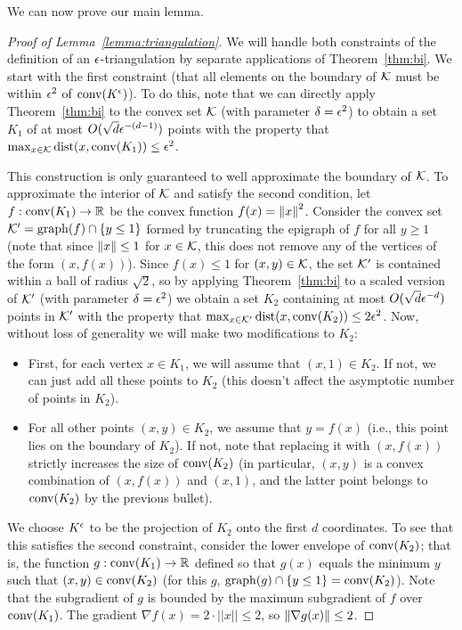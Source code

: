 We can now prove our main lemma.

\begin{proof}[Proof of Lemma~\ref{lemma:triangulation}]


We will handle both constraints of the definition of an $\epsilon$-triangulation by separate applications of Theorem~\ref{thm:bi}. We start with the first constraint (that all elements on the boundary of $\mathcal{K}$ must be within $\epsilon^2$ of $\mathrm{conv}(K^{\epsilon})$). To do this, note that we can directly apply Theorem~\ref{thm:bi} to the convex set $\mathcal{K}$ (with parameter $\delta = \epsilon^2$) to obtain a set $K_1$ of at most $O(\sqrt{d}\epsilon^{-(d-1)})$ points with the property that $\max_{x \in \mathcal{K}} \operatorname{dist}(x, \mathrm{conv}(K_1)) \leq \epsilon^2$. 

This construction is only guaranteed to well approximate the boundary of $\mathcal{K}$. To approximate the interior of $\mathcal{K}$ and satisfy the second condition, let $f: \mathrm{conv}(K_1) \rightarrow \mathbb{R}$ be the  convex function $f(x) = \left\|x\right\|^2$. Consider the convex set $\mathcal{K}' = \operatorname{graph}(f) \cap \{y \leq 1\}$ formed by truncating the epigraph of $f$ for all $y \geq 1$ (note that since $\left\|x\right\| \leq 1$ for $x \in \mathcal{K}$, this does not remove any of the vertices of the form $(x, f(x))$). Since $f(x) \leq 1$ for $(x,y) \in \mathcal{K}$, the set $\mathcal{K}'$ is contained within a ball of radius $\sqrt{2}$, so by applying Theorem~\ref{thm:bi} to a scaled version of $\mathcal{K}'$ (with parameter $\delta = \epsilon^2$) we obtain a set $K_2$ containing at most $O(\sqrt{d}\epsilon^{-d})$ points in $\mathcal{K}'$ with the property that $\max_{x \in \mathcal{K}'} \operatorname{dist}(x, \mathrm{conv}(K_2)) \leq 2\epsilon^2$. Now, without loss of generality we will make two modifications to $K_2$:

\begin{itemize}
    \item First, for each vertex $x \in K_1$, we will assume that $(x, 1) \in K_2$. If not, we can just add all these points to $K_2$ (this doesn't affect the asymptotic number of points in $K_2$).
    \item For all other points $(x, y) \in K_2$, we assume that $y = f(x)$ (i.e., this point lies on the boundary of $K_2$). If not, note that replacing it with $(x, f(x))$ strictly increases the size of $\mathrm{conv}(K_2)$ (in particular, $(x, y)$ is a convex combination of $(x, f(x))$ and $(x, 1)$, and the latter point belongs to $\mathrm{conv}(K_2)$ by the previous bullet).
\end{itemize}

We choose $K^{\epsilon}$ to be the projection of $K_2$ onto the first $d$ coordinates. To see that this satisfies the second constraint, consider the lower envelope of $\mathrm{conv}(K_2)$; that is, the function $g: \mathrm{conv}(K_1) \rightarrow \mathbb{R}$ defined so that $g(x)$ equals the minimum $y$ such that $(x, y) \in \mathrm{conv}(K_2)$ (for this $g$, $\operatorname{graph}(g) \cap \{y \leq 1\} = \mathrm{conv}(K_2)$). Note that the subgradient of $g$ is bounded by the maximum subgradient of $f$ over $\mathrm{conv}(K_1)$. The gradient $\nabla f(x) = 2\cdot ||x|| \leq 2$, so $\left\|\nabla g(x)\right\| \leq 2$.


\end{proof}
